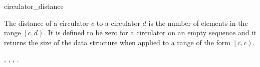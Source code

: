 
\begin{ccRefFunction}{circulator_distance}

\ccDefinition


The distance of a circulator $c$ to a circulator $d$ is the number of
elements in the range $\left[c, d\right)$. It is defined to be zero
for a circulator on an empty sequence and it returns the size of the data
structure when applied to a range of the form $\left[c, c\right)$.



\ccSeeAlso

,
,
,
.

\end{ccRefFunction}

